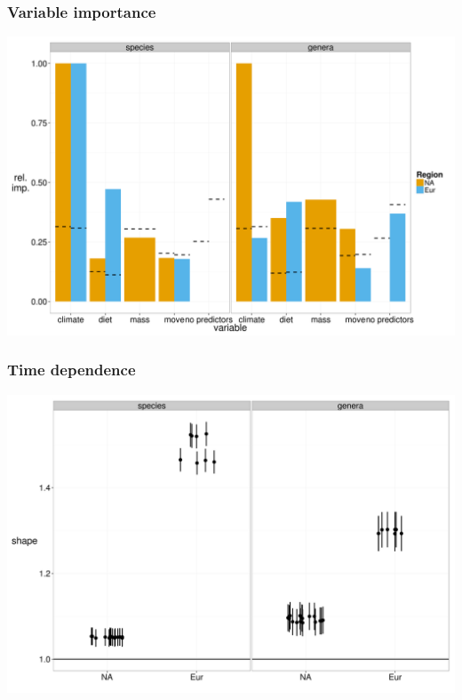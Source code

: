 \documentclass{beamer}
\begin{document}
\begin{frame}
  \frametitle{Variable importance}
  \includegraphics[height=0.8\textheight,width=\textwidth,keepaspectratio=true]{figure/rel_imp_com}

\end{frame}

\begin{frame}
  \frametitle{Time dependence}

  \includegraphics[height=0.8\textheight,width=\textwidth,keepaspectratio=true]{figure/shape_est}

\end{frame}
\end{document}
